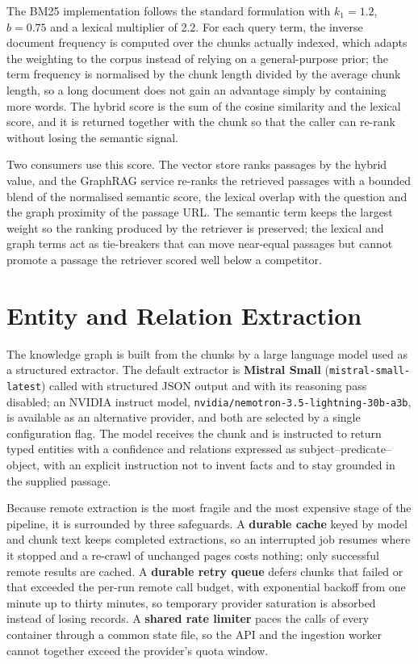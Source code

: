 The BM25 implementation follows the standard formulation with $k_1 = 1.2$, $b = 0.75$ and a lexical multiplier of 2.2. For each query term, the inverse document frequency is computed over the chunks actually indexed, which adapts the weighting to the corpus instead of relying on a general-purpose prior; the term frequency is normalised by the chunk length divided by the average chunk length, so a long document does not gain an advantage simply by containing more words. The hybrid score is the sum of the cosine similarity and the lexical score, and it is returned together with the chunk so that the caller can re-rank without losing the semantic signal.

Two consumers use this score. The vector store ranks passages by the hybrid value, and the GraphRAG service re-ranks the retrieved passages with a bounded blend of the normalised semantic score, the lexical overlap with the question and the graph proximity of the passage URL. The semantic term keeps the largest weight so the ranking produced by the retriever is preserved; the lexical and graph terms act as tie-breakers that can move near-equal passages but cannot promote a passage the retriever scored well below a competitor.

\section{Entity and Relation Extraction}
\label{sec:extraction}
The knowledge graph is built from the chunks by a large language model used as a structured extractor. The default extractor is \textbf{Mistral Small} (\texttt{mistral-small-latest}) called with structured JSON output and with its reasoning pass disabled; an NVIDIA instruct model, \texttt{nvidia/nemotron-3.5-lightning-30b-a3b}, is available as an alternative provider, and both are selected by a single configuration flag. The model receives the chunk and is instructed to return typed entities with a confidence and relations expressed as subject--predicate--object, with an explicit instruction not to invent facts and to stay grounded in the supplied passage.

Because remote extraction is the most fragile and the most expensive stage of the pipeline, it is surrounded by three safeguards. A \textbf{durable cache} keyed by model and chunk text keeps completed extractions, so an interrupted job resumes where it stopped and a re-crawl of unchanged pages costs nothing; only successful remote results are cached. A \textbf{durable retry queue} defers chunks that failed or that exceeded the per-run remote call budget, with exponential backoff from one minute up to thirty minutes, so temporary provider saturation is absorbed instead of losing records. A \textbf{shared rate limiter} paces the calls of every container through a common state file, so the API and the ingestion worker cannot together exceed the provider's quota window.

